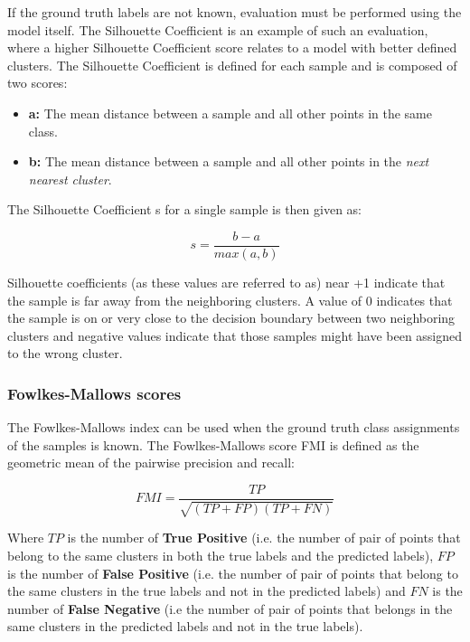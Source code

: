 \documentclass[a4paper, 12pt]{article}
\begin{document}
If the ground truth labels are not known, evaluation must be performed using the model itself. The Silhouette Coefficient \citep{rousseeuw1987silhouettes} is an example of such an evaluation, where a higher Silhouette Coefficient score relates to a model with better defined clusters. The Silhouette Coefficient is defined for each sample and is composed of two scores:

\begin{itemize}
    \item \textbf{a:} The mean distance between a sample and all other points in the same class.
    \item \textbf{b:} The mean distance between a sample and all other points in the \textit{next nearest cluster}.
\end{itemize}

The Silhouette Coefficient s for a single sample is then given as:

\begin{equation} \label{eq21}
    s = \frac{b - a}{max(a,b)}
\end{equation}

Silhouette coefficients (as these values are referred to as) near +1 indicate that the sample is far away from the neighboring clusters. A value of 0 indicates that the sample is on or very close to the decision boundary between two neighboring clusters and negative values indicate that those samples might have been assigned to the wrong cluster.

\subsubsection{Fowlkes-Mallows scores}

The Fowlkes-Mallows index \citep{fowlkes1983method} can be used when the ground truth class assignments of the samples is known. The Fowlkes-Mallows score FMI is defined as the geometric mean of the pairwise precision and recall:

\begin{equation} \label{eq22}
    FMI = \frac{TP}{\sqrt{(TP + FP)(TP + FN)}}
\end{equation}

Where $TP$ is the number of \textbf{True Positive} (i.e. the number of pair of points that belong to the same clusters in both the true labels and the predicted labels), $FP$ is the number of \textbf{False Positive} (i.e. the number of pair of points that belong to the same clusters in the true labels and not in the predicted labels) and $FN$ is the number of \textbf{False Negative} (i.e the number of pair of points that belongs in the same clusters in the predicted labels and not in the true labels).
\end{document}
